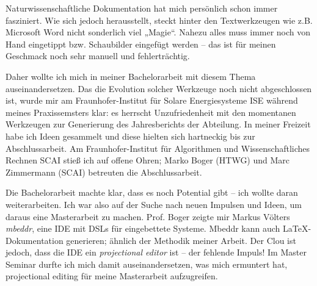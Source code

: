 Naturwissenschaftliche Dokumentation hat mich persönlich schon immer fasziniert.
Wie sich jedoch herausstellt, steckt hinter den Textwerkzeugen wie z.B. Microsoft Word
nicht sonderlich viel „Magie“. Nahezu alles muss immer noch von Hand eingetippt
bzw. Schaubilder eingefügt werden -- das ist für meinen Geschmack noch sehr manuell und fehlerträchtig.

Daher wollte ich mich in meiner Bachelorarbeit \citep{Hodapp} mit diesem Thema auseinandersetzen.
Das die Evolution solcher Werkzeuge noch nicht abgeschlossen ist, wurde
mir am Fraunhofer-Institut für Solare Energiesysteme ISE während meines Praxissemsters klar:
es herrscht Unzufriedenheit mit den momentanen Werkzeugen zur Generierung des Jahresberichts der Abteilung.
In meiner Freizeit habe ich Ideen gesammelt und diese hielten sich hartneckig
bis zur Abschlussarbeit.
Am Fraunhofer-Institut für Algorithmen und Wissenschaftliches Rechnen SCAI stieß ich auf
offene Ohren; Marko Boger (HTWG) und Marc Zimmermann (SCAI) betreuten die Abschlussarbeit.

Die Bachelorarbeit machte klar,
dass es noch Potential gibt -- ich wollte daran weiterarbeiten.
Ich war also auf der Suche nach neuen Impulsen und Ideen, um daraus eine Masterarbeit zu machen.
Prof. Boger zeigte mir Markus Völters \emph{mbeddr}, eine IDE mit DSLs für eingebettete Systeme.
Mbeddr kann auch LaTeX-Dokumentation generieren; ähnlich der Methodik meiner Arbeit.
Der Clou ist jedoch, dass die IDE ein \emph{projectional editor} ist --
der fehlende Impuls! Im Master Seminar durfte ich mich damit auseinandersetzen,
was mich ermuntert hat, projectional editing für meine Masterarbeit aufzugreifen.

